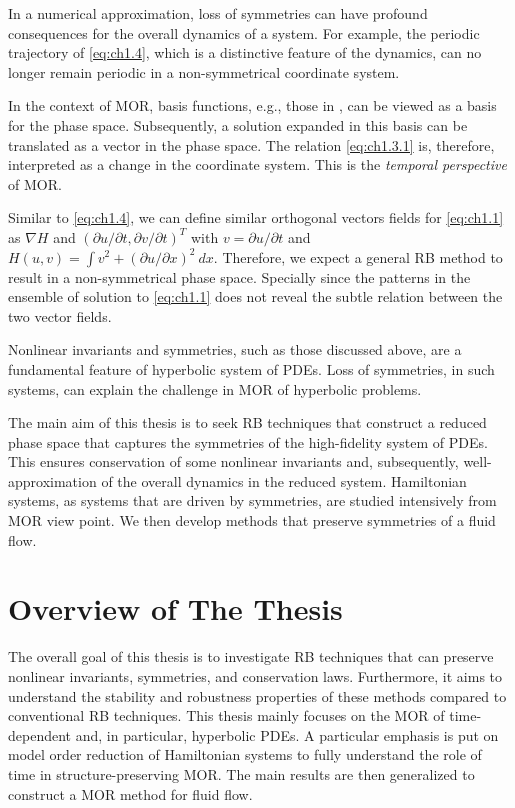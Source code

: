 In a numerical approximation, loss of symmetries can have profound consequences for the overall dynamics of a system. For example, the periodic trajectory of \eqref{eq:ch1.4}, which is a distinctive feature of the dynamics, can no longer remain periodic in a non-symmetrical coordinate system.

In the context of MOR, basis functions, e.g., those in , can be viewed as a basis for the phase space. Subsequently, a solution expanded in this basis can be translated as a vector in the phase space. The relation \eqref{eq:ch1.3.1} is, therefore, interpreted as a change in the coordinate system. This is the \emph{temporal perspective} of MOR.  

Similar to \eqref{eq:ch1.4}, we can define similar orthogonal vectors fields for \eqref{eq:ch1.1} as $\nabla H$ and $(\partial u/\partial t,\partial v/\partial t)^T$ with $v = \partial u/\partial t$ and $H(u,v) = \int v^2 + (\partial u / \partial x)^2 \ dx$. Therefore, we expect a general RB method to result in a non-symmetrical phase space. Specially since the patterns in the ensemble of solution to \eqref{eq:ch1.1} does not reveal the subtle relation between the two vector fields.

Nonlinear invariants and symmetries, such as those discussed above, are a fundamental feature of hyperbolic system of PDEs. Loss of symmetries, in such systems, can explain the challenge in MOR of hyperbolic problems.

The main aim of this thesis is to seek RB techniques that construct a reduced phase space that captures the symmetries of the high-fidelity system of PDEs. This ensures conservation of some nonlinear invariants and, subsequently, well-approximation of the overall dynamics in the reduced system. Hamiltonian systems, as systems that are driven by symmetries, are studied intensively from MOR view point. We then develop methods that preserve symmetries of a fluid flow.

\section*{Overview of The Thesis}
The overall goal of this thesis is to investigate RB techniques that can preserve nonlinear invariants, symmetries, and conservation laws. Furthermore, it aims to understand the stability and robustness properties of these methods compared to conventional RB techniques. This thesis mainly focuses on the MOR of time-dependent and, in particular, hyperbolic PDEs. A particular emphasis is put on model order reduction of Hamiltonian systems to fully understand the role of time in structure-preserving MOR. The main results are then generalized to construct a MOR method for fluid flow.

